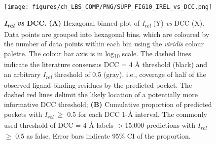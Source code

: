 \begin{figure}[htb!]
    \centering
    \texttt{[image: figures/ch\_LBS\_COMP/PNG/SUPP\_FIG10\_IREL\_vs\_DCC.png]}
    \caption[\textit{I\textsubscript{rel}} \textit{vs} DCC]{\textbf{\textit{I\textsubscript{rel}} \textit{vs} DCC.} \textbf{(A)} Hexagonal binned plot of \textit{I\textsubscript{rel}} (Y) \textit{vs} DCC (X). Data points are grouped into hexagonal bins, which are coloured by the number of data points within each bin using the \textit{viridis} colour palette. The colour bar axis is in log\textsubscript{10} scale. The dashed lines indicate the literature consensus DCC = 4 \AA{} threshold (black) and an arbitrary \textit{I\textsubscript{rel}} threshold of 0.5 (gray), i.e., coverage of half of the observed ligand-binding residues by the predicted pocket. The dashed red lines delimit the likely location of a potentially more informative DCC threshold; \textbf{(B)} Cumulative proportion of predicted pockets with \textit{I\textsubscript{rel}} $\geq$ 0.5 for each DCC 1-\AA{} interval. The commonly used threshold of DCC = 4 \AA{} labels $>$15,000 predictions with \textit{I\textsubscript{rel}} $\geq$ 0.5 as false. Error bars indicate 95\% CI of the proportion.}
    \label{fig:irel_vs_dcc}
\end{figure}

